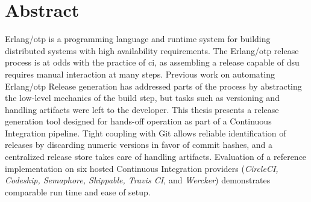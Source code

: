 \cleardoublepage{}

\section*{Abstract}

Erlang/\acrshort{otp} is a programming language and runtime system for building distributed systems with high availability requirements. The Erlang/\acrshort{otp} release process is at odds with the practice of \acrlong{ci}, as assembling a release capable of \acrfull{dsu} requires manual interaction at many steps. Previous work on automating Erlang/\acrshort{otp} Release generation has addressed parts of the process by abstracting the low-level mechanics of the build step, but tasks such as versioning and handling artifacts were left to the developer. This thesis presents a release generation tool designed for hands-off operation as part of a Continuous Integration pipeline. Tight coupling with Git allows reliable identification of releases by discarding numeric versions in favor of commit hashes, and a centralized release store takes care of handling artifacts. Evaluation of a reference implementation on six hosted Continuous Integration providers (\emph{CircleCI, Codeship, Semaphore, Shippable, Travis CI,} and \emph{Wercker}) demonstrates comparable run time and ease of setup.
